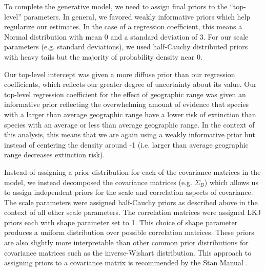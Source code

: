 \documentclass[12pt,letterpaper]{article}
\begin{document}
\begin{refsection}
To complete the generative model, we need to assign final priors to the ``top-level'' parameters. In general, we favored weakly informative priors which help regularize our estimates. In the case of a regression coefficient, this means a Normal distribution with mean 0 and a standard deviation of 3. For our scale parameters (e.g. standard deviations), we used half-Cauchy distributed priors with heavy tails but the majority of probability density near 0.

Our top-level intercept was given a more diffuse prior than our regression coefficients, which reflects our greater degree of uncertainty about its value. Our top-level regression coefficient for the effect of geographic range was given an informative prior reflecting the overwhelming amount of evidence that species with a larger than average geographic range have a lower risk of extinction than species with an average or less than average geographic range. In the context of this analysis, this means that we are again using a weakly informative prior but instead of centering the density around -1 (i.e. larger than average geographic range decreases extinction risk).

Instead of assigning a prior distribution for each of the covariance matrices in the model, we instead decomposed the covariance matrices (e.g. \(\Sigma_{B}\)) which allows us to assign independent priors for the scale and correlation aspects of covariance. The scale parameters were assigned half-Cauchy priors as described above in the context of all other scale parameters. The correlation matrices were assigned LKJ priors each with shape parameter set to 1. This choice of shape parameter produces a uniform distribution over possible correlation matrices. These priors are also slightly more interpretable than other common prior distributions for covariance matrices such as the inverse-Wishart distribution. This approach to assigning priors to a covariance matrix is recommended by the Stan Manual \citep{StanManual}.


\end{refsection}
\end{document}
